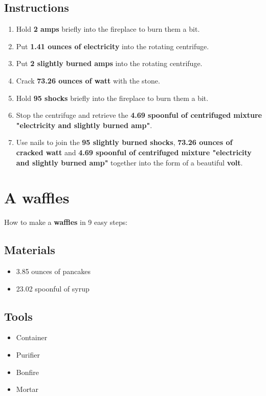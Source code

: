 \documentclass{article}
\begin{document}
\subsection{Instructions}\begin{enumerate}
\item 
Hold \textbf{2 amps} briefly into the fireplace to burn them a bit.
\item 
Put \textbf{1.41 ounces of electricity} into the rotating centrifuge.
\item 
Put \textbf{2 slightly burned amps} into the rotating centrifuge.
\item 
Crack \textbf{73.26 ounces of watt} with the stone.
\item 
Hold \textbf{95 shocks} briefly into the fireplace to burn them a bit.
\item 
Stop the centrifuge and retrieve the \textbf{4.69 spoonful of centrifuged mixture "electricity and slightly burned amp"}.
\item 
Use nails to join the \textbf{95 slightly burned shocks}, \textbf{73.26 ounces of cracked watt} and \textbf{4.69 spoonful of centrifuged mixture "electricity and slightly burned amp"} together into the form of a beautiful \textbf{volt}.
\end{enumerate}
\newpage
\section{A waffles}How to make a \textbf{waffles} in 9 easy steps:

\subsection{Materials}\begin{itemize}
\item 
3.85 ounces of pancakes
\item 
23.02 spoonful of syrup
\end{itemize}
\subsection{Tools}\begin{itemize}
\item 
Container
\item 
Purifier
\item 
Bonfire
\item 
Mortar
\end{itemize}
\end{document}
